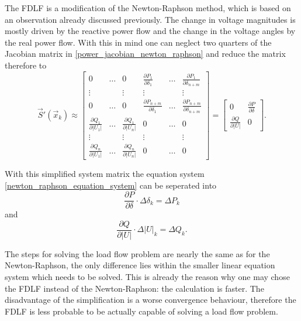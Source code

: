 The FDLF is a modification of the Newton-Raphson method, which is based on an observation already discussed previously. The change in voltage magnitudes is mostly driven by the reactive power flow and the change in the voltage angles by the real power flow. With this in mind one can neglect two quarters of the Jacobian matrix in \eqref{power_jacobian_newton_raphson} and reduce the matrix therefore to
\begin{equation}
	\vec S' (\vec x_k) \approx 
	\begin{bmatrix}
		0	& \hdots	& 0	& \frac{\partial P_1}{\partial \delta_1}	& \hdots	& \frac{\partial P_1}{\partial \delta_{n + m}} \\
		\vdots								&			& \vdots								& \vdots									&			& \vdots \\
		0	& \hdots	& 0	& \frac{\partial P_{n + m}}{\partial \delta_1}	& \hdots	& \frac{\partial P_{n + m}}{\partial \delta_{n + m}} \\
		\frac{\partial Q_1}{\partial |U_1|}	& \hdots	& \frac{\partial Q_1}{\partial |U_n|}	& 0	& \hdots	& 0 \\
		\vdots								&			& \vdots								& \vdots									&			& \vdots \\
		\frac{\partial Q_n}{\partial |U_1|}	& \hdots	& \frac{\partial Q_n}{\partial |U_n|}	& 0	& \hdots	& 0
	\end{bmatrix} =
	\begin{bmatrix}
		0								&	\frac{\partial P}{\partial \delta} \\
		\frac{\partial Q}{\partial |U|}	&	0
	\end{bmatrix}.
\end{equation}

With this simplified system matrix the equation system \eqref{newton_raphson_equation_system} can be seperated into
\begin{equation}
	\frac{\partial P}{\partial \delta} \cdot \Delta \delta_k = \Delta P_k
\end{equation}
and
\begin{equation}
	\frac{\partial Q}{\partial |U|} \cdot \Delta |U|_k = \Delta Q_k.
\end{equation}

The steps for solving the load flow problem are nearly the same as for the Newton-Raphson, the only difference lies within the smaller linear equation system which needs to be solved. This is already the reason why one may chose the FDLF instead of the Newton-Raphson: the calculation is faster. The disadvantage of the simplification is a worse convergence behaviour, therefore the FDLF is less probable to be actually capable of solving a load flow problem.

